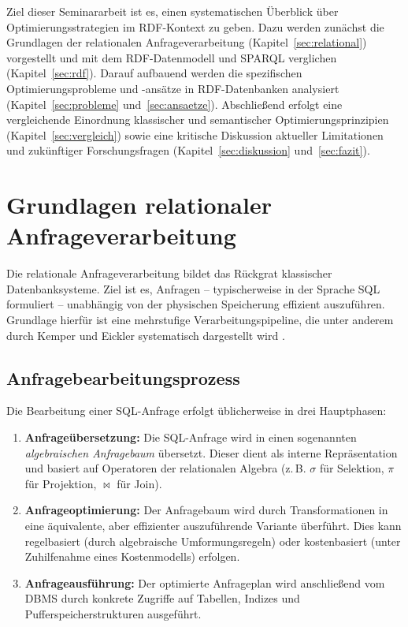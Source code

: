 \documentclass[12pt]{article}
\begin{document}
Ziel dieser Seminararbeit ist es, einen systematischen Überblick über Optimierungsstrategien im RDF-Kontext zu geben. Dazu werden zunächst die Grundlagen der relationalen Anfrageverarbeitung (Kapitel~\ref{sec:relational}) vorgestellt und mit dem RDF-Datenmodell und SPARQL verglichen (Kapitel~\ref{sec:rdf}). Darauf aufbauend werden die spezifischen Optimierungsprobleme und -ansätze in RDF-Datenbanken analysiert (Kapitel~\ref{sec:probleme} und~\ref{sec:ansaetze}). Abschließend erfolgt eine vergleichende Einordnung klassischer und semantischer Optimierungsprinzipien (Kapitel~\ref{sec:vergleich}) sowie eine kritische Diskussion aktueller Limitationen und zukünftiger Forschungsfragen (Kapitel~\ref{sec:diskussion} und~\ref{sec:fazit}).


\section{Grundlagen relationaler Anfrageverarbeitung}

Die relationale Anfrageverarbeitung bildet das Rückgrat klassischer Datenbanksysteme. Ziel ist es, Anfragen – typischerweise in der Sprache SQL formuliert – unabhängig von der physischen Speicherung effizient auszuführen. Grundlage hierfür ist eine mehrstufige Verarbeitungspipeline, die unter anderem durch Kemper und Eickler systematisch dargestellt wird \cite{kemper2022datenbanksysteme}.

\subsection{Anfragebearbeitungsprozess}

Die Bearbeitung einer SQL-Anfrage erfolgt üblicherweise in drei Hauptphasen:

\begin{enumerate}
    \item \textbf{Anfrageübersetzung:} Die SQL-Anfrage wird in einen sogenannten \emph{algebraischen Anfragebaum} übersetzt. Dieser dient als interne Repräsentation und basiert auf Operatoren der relationalen Algebra (z.\,B. $\sigma$ für Selektion, $\pi$ für Projektion, $\bowtie$ für Join).
    
    \item \textbf{Anfrageoptimierung:} Der Anfragebaum wird durch Transformationen in eine äquivalente, aber effizienter auszuführende Variante überführt. Dies kann regelbasiert (durch algebraische Umformungsregeln) oder kostenbasiert (unter Zuhilfenahme eines Kostenmodells) erfolgen.
    
    \item \textbf{Anfrageausführung:} Der optimierte Anfrageplan wird anschließend vom DBMS durch konkrete Zugriffe auf Tabellen, Indizes und Pufferspeicherstrukturen ausgeführt.
\end{enumerate}
\end{document}
